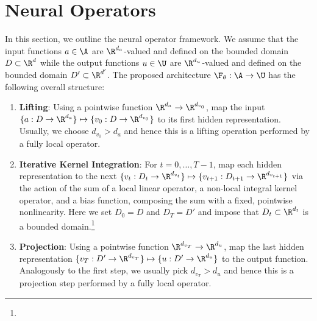 \section{Neural Operators}
\label{sec:neuraloperators}


In this section, we outline the neural operator framework.
We assume that the input functions \(a \in \A\) are \(\R^{d_a}\)-valued and defined on the bounded domain \(D \subset \R^d\) while the output functions \(u \in \U\) are \(\R^{d_u}\)-valued and defined on the bounded domain \(D' \subset \R^{d'}\).
The proposed architecture $\F_{\theta} : \A \to \U$ has the following overall structure:
\begin{enumerate}
    
    \item \textbf{Lifting}: Using a pointwise function \(\R^{d_a} \to \R^{d_{v_0}}\), map the input $\{a: D \to \R^{d_a}\} \mapsto \{v_0: D \to \R^{d_{v_0}}\}$ to its first hidden representation. Usually, we choose \(d_{v_0} > d_a\) and hence this is a lifting operation performed by a fully local operator.
    
    \item \textbf{Iterative Kernel Integration}: For \(t=0,\dots,T-1\), map each hidden representation to the next $\{v_t: D_t \to \R^{d_{v_t}}\} \mapsto \{v_{t+1}: D_{t+1} \to \R^{d_{v_{t+1}}}\}$ via the action of the sum of a local linear operator, a non-local integral kernel operator, and a bias function, composing the
    sum with a fixed, pointwise nonlinearity. Here we set \(D_0 = D\) and \(D_T = D'\) and impose that \(D_t \subset \R^{d_t}\) is a bounded domain.\footnote{}
    
    \item \textbf{Projection}: Using a pointwise function \(\R^{d_{v_T}} \to \R^{d_u}\), map the last hidden representation $\{v_T: D' \to \R^{d_{v_T}}\} \mapsto \{u: D' \to \R^{d_u}\}$ to the output function. Analogously to the first step, we usually pick \(d_{v_T} > d_u\) and hence this is a projection step performed by a fully local operator.
\end{enumerate}

